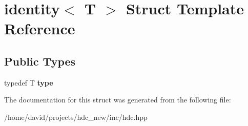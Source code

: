 \hypertarget{structidentity}{}\section{identity$<$ T $>$ Struct Template Reference}
\label{structidentity}
\subsection*{Public Types}
\begin{DoxyCompactItemize}
\item 
typedef T {\bfseries type}\hypertarget{structidentity_af1d3cc50c66b9e147900b63d85cdd841}{}\label{structidentity_af1d3cc50c66b9e147900b63d85cdd841}

\end{DoxyCompactItemize}


The documentation for this struct was generated from the following file\+:\begin{DoxyCompactItemize}
\item 
/home/david/projects/hdc\+\_\+new/inc/hdc.\+hpp\end{DoxyCompactItemize}
